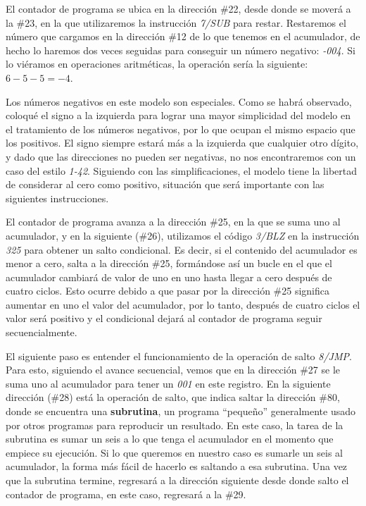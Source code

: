 \documentclass[letterpaper,12pt,oneside]{book}
\begin{document}
	El contador de programa se ubica en la dirección \#22, desde donde se moverá a la \#23, en la que utilizaremos la instrucción \textit{7/SUB} para restar. Restaremos el 
	número que cargamos en la dirección \#12 de lo que tenemos en el acumulador, de hecho lo haremos dos veces seguidas para conseguir un número 	
	negativo: \textit{-004}. Si lo viéramos en operaciones aritméticas, la operación sería la siguiente: $ 6-5-5 = -4 $.
 
    Los números negativos en este modelo son especiales.
	Como se habrá observado, coloqué el signo
	a la izquierda para lograr una mayor simplicidad del modelo en el tratamiento de los números negativos,
	por lo que ocupan el mismo espacio que los positivos. El signo siempre estará más a la izquierda que cualquier otro dígito, y dado que las direcciones
	no pueden ser negativas, no nos encontraremos con un caso del estilo \textit{1-42}. Siguiendo con las simplificaciones, el modelo tiene la libertad de considerar al cero como positivo, situación que será importante con las siguientes instrucciones.
	
	El contador de programa avanza a la dirección \#25, en la que se suma uno al acumulador, y en la siguiente (\#26), utilizamos el código 
	\textit{3/BLZ} en la instrucción \textit{325} para obtener un salto condicional. Es decir, si el contenido del acumulador es menor a cero, salta a la 
	dirección \#25, formándose así un bucle
	en el que el acumulador cambiará de valor de uno en uno hasta llegar a cero después de cuatro ciclos. Esto ocurre
	debido a que pasar por la dirección \#25 significa aumentar en uno el valor del acumulador, por lo tanto, después de cuatro
	ciclos el valor será positivo y el condicional dejará al contador de programa seguir secuencialmente.
	
	
	El siguiente paso es entender el funcionamiento de la operación de salto \textit{8/JMP}. Para esto, siguiendo el avance secuencial, vemos que en la dirección
	\#27 se le suma uno al acumulador para tener un \textit{001} en este registro. En la siguiente dirección (\#28) está la operación
	de salto, que indica saltar
	la dirección \#80, donde se encuentra
	una \textbf{subrutina}, un programa ``pequeño'' generalmente usado por otros programas para reproducir un resultado. En este caso, la tarea
	de la subrutina
	es sumar un seis a lo que tenga el acumulador en el momento que empiece su ejecución. Si lo que queremos en nuestro caso
	es sumarle un seis al acumulador, la forma más fácil de hacerlo es saltando a esa subrutina. Una vez
	que la subrutina termine, regresará a la dirección
	siguiente desde donde salto el contador de programa, en este caso, regresará a la \#29.
	
\end{document}
